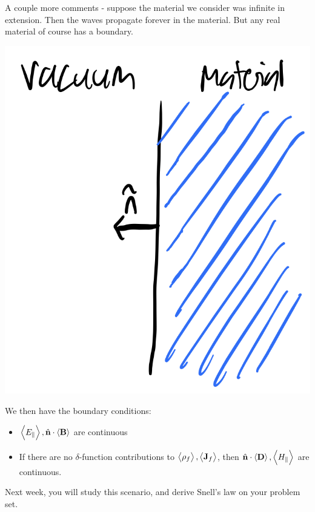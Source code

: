 A couple more comments - suppose the material we consider was infinite in extension. Then the waves propagate forever in the material. But any real material of course has a boundary. 

\begin{center}
    \includegraphics[scale=0.35]{Lectures/Images/lec12-interface.png}
\end{center}

We then have the boundary conditions:
\begin{itemize}
    \item $\left< E_\parallel \right>, \hat{\mathbf{n}}\cdot\left< \mathbf{B} \right>$ are continuous
    \item If there are no $\delta$-function contributions to $\left< \rho_f \right>, \left< \mathbf{J}_f \right>$, then $\hat{\mathbf{n}}\cdot\left< \mathbf{D} \right>, \left< H_\parallel \right>$ are continuous.
\end{itemize}
Next week, you will study this scenario, and derive Snell's law on your problem set.